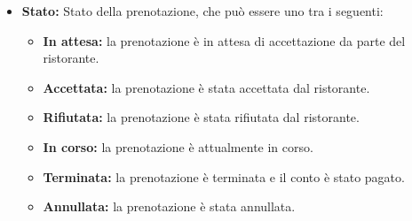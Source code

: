 \begin{itemize}
\begin{itemize}
		      \item \textbf{Stato:} Stato della prenotazione, che può essere uno tra i seguenti:
		            \begin{itemize}
			            \item \textbf{In attesa:} la prenotazione è in attesa di accettazione da parte del ristorante.
			            \item \textbf{Accettata:} la prenotazione è stata accettata dal ristorante.
			            \item \textbf{Rifiutata:} la prenotazione è stata rifiutata dal ristorante.
			            \item \textbf{In corso:} la prenotazione è attualmente in corso.
			            \item \textbf{Terminata:} la prenotazione è terminata e il conto è stato pagato.
			            \item \textbf{Annullata:} la prenotazione è stata annullata.
		            \end{itemize}
	      \end{itemize}

\end{itemize}
